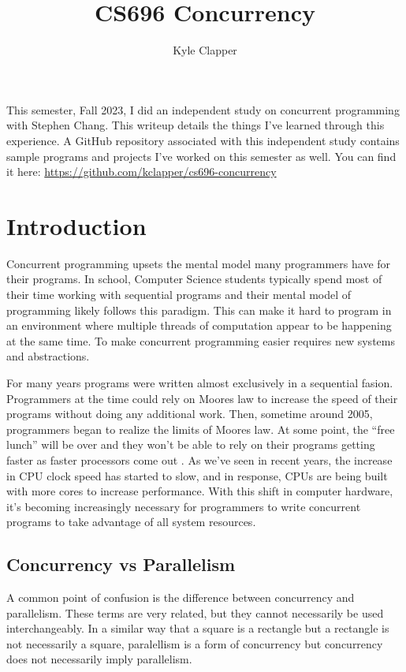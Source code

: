 \documentclass{article}
\title{CS696 Concurrency}
\author{Kyle Clapper}
\begin{document}
\maketitle

\begin{displayquote}
  This semester, Fall 2023, I did an independent study on concurrent programming
  with Stephen Chang. This writeup details the things I've learned through this
  experience. A GitHub repository associated with this independent study
  contains sample programs and projects I've worked on this semester as well.
  You can find it here:
  \href{https://github.com/kclapper/cs696-concurrency}{https://github.com/kclapper/cs696-concurrency}
\end{displayquote}

\section{Introduction}
Concurrent programming upsets the mental model many programmers have for their
programs. In school, Computer Science students typically spend most of their
time working with sequential programs and their mental model of programming
likely follows this paradigm. This can make it hard to program in an environment
where multiple threads of computation appear to be happening at the same time.
To make concurrent programming easier requires new systems and abstractions.

For many years programs were written almost exclusively in a sequential fasion.
Programmers at the time could rely on Moores law to increase the speed of their
programs without doing any additional work. Then, sometime around 2005,
programmers began to realize the limits of Moores law. At some point, the ``free
lunch'' will be over and they won't be able to rely on their programs getting
faster as faster processors come out \cite{FreeLunch, PCTheoryAndPractice,
  PPInC, MIT6031}. As we've seen in recent years, the increase in CPU clock speed has
started to slow, and in response, CPUs are being built with more cores to
increase performance. With this shift in computer hardware, it's becoming
increasingly necessary for programmers to write concurrent programs to take
advantage of all system resources.

\subsection{Concurrency vs Parallelism}
A common point of confusion is the difference between concurrency and parallelism.
These terms are very related, but they cannot necessarily be used interchangeably.
In a similar way that a square is a rectangle but a rectangle is not necessarily a
square, paralellism is a form of concurrency but concurrency does not necessarily
imply parallelism.
\end{document}
